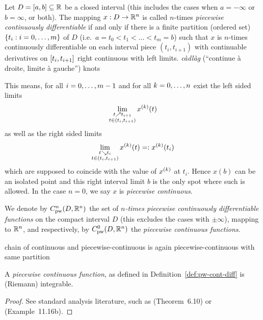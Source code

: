     \begin{definition}\label{def:pw-cont-diff}
        Let $D=[a,b]\subseteq\mathbb{R}$ be a closed interval (this includes the cases when $a=-\infty$ or $b=\infty$, or both). The mapping $x:D\rightarrow\mathbb{R}^n$ is called $n$-times \emph{piecewise continuously differentiable} if and only if there is a finite partition (ordered set) $\{t_i:i=0,\ldots,m\}$ of $D$ (i.e.\ $a=t_0<t_1<\ldots<t_m=b$) such that $x$ is $n$-times continuously differentiable on each interval piece $(t_i,t_{i+1})$ with continuable derivatives on $[t_i,t_{i+1}]$ right continuous with left limits.
        \emph{càdlàg} (``continue à droite, limite à gauche'')
        knots

        This means, for all $i=0,\ldots,m-1$ and for all $k=0,\ldots,n$ exist the left sided limits
        \begin{equation}
            \lim_{\substack{t\upto t_{i+1}\\ t\in(t_i,t_{i+1})}} \D[k]{x}(t)
        \end{equation}
        as well as the right sided limits
        \begin{equation}
            \lim_{\substack{t\downto t_{i}\\ t\in(t_i,t_{i+1})}} \D[k]{x}(t) =: \D[k]{x}(t_i)
        \end{equation}
        which are supposed to coincide with the value of $\D[k]{x}$ at $t_i$.
        Hence $x(b)$ can be an isolated point and this right interval limit $b$ is the only spot where such is allowed.
        In the case $n=0$, we say $x$ is \emph{piecewise continuous}.

        We denote by $\Cnpw[n]{D}{\R^n}$ the set of \emph{$n$-times piecewise continuously differentiable functions} on the compact interval $D$ (this excludes the cases with $\pm\infty$), mapping to $\mathbb{R}^n$, and respectively, by $\Cnpw[0]{D}{\R^n}$ the \emph{piecewise continuous functions}.
    \end{definition}


    \begin{lemma}
        chain of continuous and piecewise-continuous is again piecewise-continuous with same partition
    \end{lemma}

    \begin{lemma}[]\label{lm:pc-integrable}
        A \emph{piecewise continuous function}, as defined in Definition~\ref{def:pw-cont-diff} is (Riemann) integrable.
    \end{lemma}
    \begin{proof}
        See standard analysis literature, such as \cite{Rudin76PrinciplesAnalysis} (Theorem~6.10) or \cite{Gathmann12GDM} (Example~11.16b).
    \end{proof}

